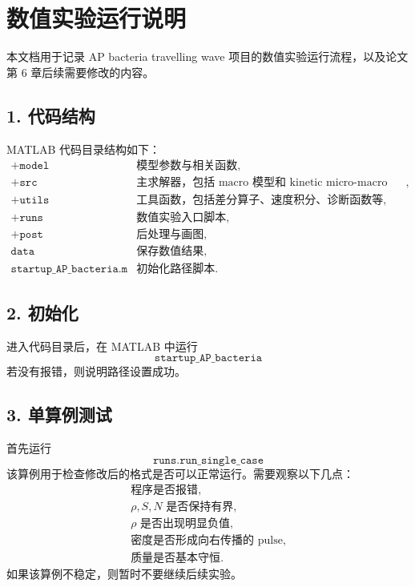 \section*{数值实验运行说明}

本文档用于记录 AP bacteria travelling wave 项目的数值实验运行流程，以及论文第 6 章后续需要修改的内容。

\subsection*{1. 代码结构}

MATLAB 代码目录结构如下：
\[
\begin{array}{ll}
\texttt{+model} & \text{模型参数与相关函数},\\
\texttt{+src} & \text{主求解器，包括 macro 模型和 kinetic micro-macro AP 格式},\\
\texttt{+utils} & \text{工具函数，包括差分算子、速度积分、诊断函数等},\\
\texttt{+runs} & \text{数值实验入口脚本},\\
\texttt{+post} & \text{后处理与画图},\\
\texttt{data} & \text{保存数值结果},\\
\texttt{startup\_AP\_bacteria.m} & \text{初始化路径脚本}.
\end{array}
\]

\subsection*{2. 初始化}

进入代码目录后，在 MATLAB 中运行
\[
\texttt{startup\_AP\_bacteria}
\]
若没有报错，则说明路径设置成功。

\subsection*{3. 单算例测试}

首先运行
\[
\texttt{runs.run\_single\_case}
\]
该算例用于检查修改后的格式是否可以正常运行。需要观察以下几点：
\[
\begin{array}{l}
\text{程序是否报错},\\
\rho,S,N \text{ 是否保持有界},\\
\rho \text{ 是否出现明显负值},\\
\text{密度是否形成向右传播的 pulse},\\
\text{质量是否基本守恒}.
\end{array}
\]
如果该算例不稳定，则暂时不要继续后续实验。

